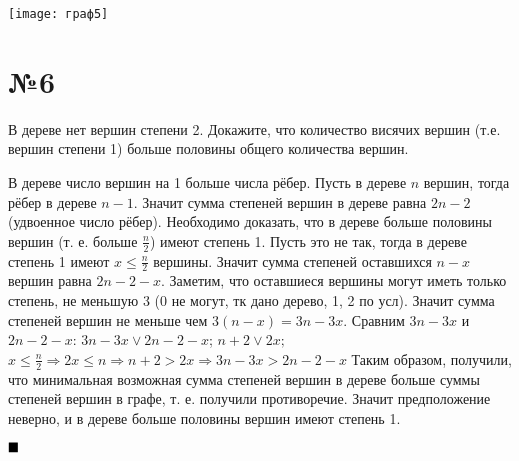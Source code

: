 \documentclass[a4paper, 16pt]{article}
\newenvironment{proof}[1][Доказательство]{%
	\begin{trivlist}
		\item[\hskip \labelsep {\bfseries #1:}]
		\item \hspace{14pt}
	}{
		$ \hfill\blacksquare $
	\end{trivlist}
	\hfill\break
}
\begin{document}
				\texttt{[image: граф5]}
		
		\section*{№6}
		
			В дереве нет вершин степени 2. Докажите, что количество висячих вершин (т.е. вершин степени 1)
			больше половины общего количества вершин.
			
			\begin{proof}
				В дереве число вершин на 1 больше числа рёбер. Пусть в дереве $n$ вершин, тогда рёбер в дереве $n-1$. Значит сумма степеней вершин в дереве равна $2n-2$ (удвоенное число рёбер). Необходимо доказать, что в дереве больше половины вершин (т. е. больше $\frac{n}{2}$) имеют степень 1. Пусть это не так, тогда в дереве степень 1 имеют $x \leq \frac{n}{2}$ вершины. Значит сумма степеней оставшихся $n - x$ вершин равна $2n - 2 - x$. Заметим, что оставшиеся вершины могут иметь только степень, не меньшую 3 (0 не могут, тк дано дерево, 1, 2 по усл). Значит сумма степеней вершин не меньше чем $3(n-x) = 3n - 3x$. Сравним $3n - 3x$ и $2n-2-x$: $3n - 3x \lor 2n-2-x$;	 
				 $n + 2 \lor 2x;$  $x \leq \frac{n}{2} \Rightarrow 2x \leq n \Rightarrow n + 2 > 2x \Rightarrow 3n - 3x > 2n-2-x$ Таким образом, получили, что минимальная возможная сумма степеней вершин в дереве больше суммы степеней вершин в графе, т. е. получили противоречие. Значит предположение неверно, и в дереве больше половины вершин имеют степень 1.
			\end{proof}
			
\end{document}

